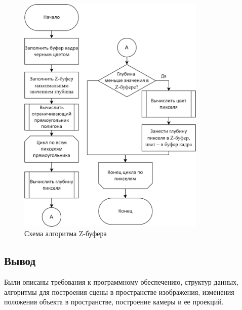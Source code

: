 \begin{figure}[h]
	\centering
	\includegraphics[width=0.8\textwidth]{img/alg-z-buffer.png}
	\caption{Схема алгоритма Z-буфера}
	\label{fig:z-buffer}
\end{figure}

\subsection*{Вывод}
Были описаны требования к программному обеспечению, структур данных, алгоритмы для построения сцены в пространстве изображения, изменения положения объекта в пространстве, построение камеры и ее проекций.